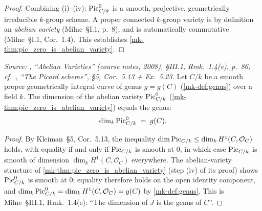 \begin{proof}
  Combining (i)--(iv): \(\operatorname{Pic}^0_{C/k}\) is a smooth, projective,
  geometrically irreducible \(k\)-group scheme. A proper connected
  \(k\)-group variety is by definition an \emph{abelian variety}
  (Milne~\S I.1, p.~8), and is automatically commutative (Milne~\S I.1,
  Cor.~1.4). This establishes
  \ref{mk-thm:pic_zero_is_abelian_variety}.
\end{proof}

\begin{theorem}\label{mk-thm:pic_zero_dimension_equals_genus}
  \leanok

  \textit{Source: \cite{milne-av}, ``Abelian Varieties'' (course notes, 2008),
  \S III.1, Rmk.~1.4(e), p.~86; cf.\ \cite{kleiman-picard}, ``The Picard scheme'',
  \S 5, Cor.~5.13 + Ex.~5.23.}
  Let \(C/k\) be a smooth proper geometrically integral curve of genus
  \(g = g(C)\) (\ref{mk-def:genus}) over a field \(k\). The dimension of
  the abelian variety \(\operatorname{Pic}^0_{C/k}\)
  (\ref{mk-thm:pic_zero_is_abelian_variety}) equals the genus:
  \[
    \dim_k \operatorname{Pic}^0_{C/k} \;=\; g(C).
  \]
\end{theorem}
\begin{proof}
  By Kleiman~\S 5,
  Cor.~5.13, the inequality
  \(\dim \operatorname{Pic}_{C/k} \le \dim_k H^1(C, \mathcal{O}_C)\) holds, with
  equality if and only if \(\operatorname{Pic}_{C/k}\) is smooth at \(0\), in which
  case \(\operatorname{Pic}_{C/k}\) is smooth of dimension \(\dim_k H^1(C,
  \mathcal{O}_C)\) everywhere. The abelian-variety structure of
  \ref{mk-thm:pic_zero_is_abelian_variety} (step (iv) of its proof)
  shows \(\operatorname{Pic}^0_{C/k}\) is smooth at \(0\); equality therefore holds
  on the open identity component, and
  \(\dim_k \operatorname{Pic}^0_{C/k} = \dim_k H^1(C, \mathcal{O}_C) = g(C)\)
  by \ref{mk-def:genus}. This is Milne~\S III.1, Rmk.~1.4(e): ``The
  dimension of \(J\) is the genus of \(C\)''.
\end{proof}

